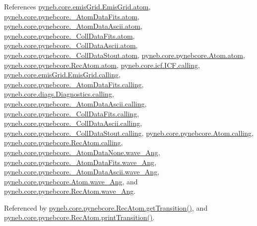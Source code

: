 References \hyperlink{emis_grid_8py_source_l00051}{pyneb.\-core.\-emis\-Grid.\-Emis\-Grid.\-atom}, \hyperlink{pynebcore_8py_source_l00089}{pyneb.\-core.\-pynebcore.\-\_\-\-Atom\-Data\-Fits.\-atom}, \hyperlink{pynebcore_8py_source_l00310}{pyneb.\-core.\-pynebcore.\-\_\-\-Atom\-Data\-Ascii.\-atom}, \hyperlink{pynebcore_8py_source_l00576}{pyneb.\-core.\-pynebcore.\-\_\-\-Coll\-Data\-Fits.\-atom}, \hyperlink{pynebcore_8py_source_l00926}{pyneb.\-core.\-pynebcore.\-\_\-\-Coll\-Data\-Ascii.\-atom}, \hyperlink{pynebcore_8py_source_l01162}{pyneb.\-core.\-pynebcore.\-\_\-\-Coll\-Data\-Stout.\-atom}, \hyperlink{pynebcore_8py_source_l01218}{pyneb.\-core.\-pynebcore.\-Atom.\-atom}, \hyperlink{pynebcore_8py_source_l02635}{pyneb.\-core.\-pynebcore.\-Rec\-Atom.\-atom}, \hyperlink{icf_8py_source_l00016}{pyneb.\-core.\-icf.\-I\-C\-F.\-calling}, \hyperlink{emis_grid_8py_source_l00044}{pyneb.\-core.\-emis\-Grid.\-Emis\-Grid.\-calling}, \hyperlink{pynebcore_8py_source_l00097}{pyneb.\-core.\-pynebcore.\-\_\-\-Atom\-Data\-Fits.\-calling}, \hyperlink{diags_8py_source_l00169}{pyneb.\-core.\-diags.\-Diagnostics.\-calling}, \hyperlink{pynebcore_8py_source_l00318}{pyneb.\-core.\-pynebcore.\-\_\-\-Atom\-Data\-Ascii.\-calling}, \hyperlink{pynebcore_8py_source_l00585}{pyneb.\-core.\-pynebcore.\-\_\-\-Coll\-Data\-Fits.\-calling}, \hyperlink{pynebcore_8py_source_l00936}{pyneb.\-core.\-pynebcore.\-\_\-\-Coll\-Data\-Ascii.\-calling}, \hyperlink{pynebcore_8py_source_l01156}{pyneb.\-core.\-pynebcore.\-\_\-\-Coll\-Data\-Stout.\-calling}, \hyperlink{pynebcore_8py_source_l01229}{pyneb.\-core.\-pynebcore.\-Atom.\-calling}, \hyperlink{pynebcore_8py_source_l02643}{pyneb.\-core.\-pynebcore.\-Rec\-Atom.\-calling}, \hyperlink{pynebcore_8py_source_l00064}{pyneb.\-core.\-pynebcore.\-\_\-\-Atom\-Data\-None.\-wave\-\_\-\-Ang}, \hyperlink{pynebcore_8py_source_l00172}{pyneb.\-core.\-pynebcore.\-\_\-\-Atom\-Data\-Fits.\-wave\-\_\-\-Ang}, \hyperlink{pynebcore_8py_source_l00438}{pyneb.\-core.\-pynebcore.\-\_\-\-Atom\-Data\-Ascii.\-wave\-\_\-\-Ang}, \hyperlink{pynebcore_8py_source_l01254}{pyneb.\-core.\-pynebcore.\-Atom.\-wave\-\_\-\-Ang}, and \hyperlink{pynebcore_8py_source_l02689}{pyneb.\-core.\-pynebcore.\-Rec\-Atom.\-wave\-\_\-\-Ang}.



Referenced by \hyperlink{pynebcore_8py_source_l02872}{pyneb.\-core.\-pynebcore.\-Rec\-Atom.\-get\-Transition()}, and \hyperlink{pynebcore_8py_source_l02891}{pyneb.\-core.\-pynebcore.\-Rec\-Atom.\-print\-Transition()}.


